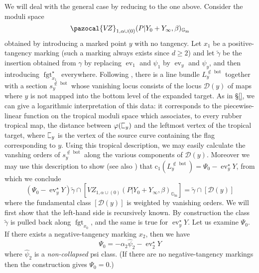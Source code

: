 \documentclass[11pt]{amsart}
\newcommand{\sqC}{\scalebox{0.8}[1.3]{$\sqsubset$}}
\newcommand{\VZ}{\pazocal{V\!Z}}
\newcommand{\st}{\star}
\newcommand{\Gm}{\mathbb{G}_{\text{m}}}
\newcommand{\ev}{\operatorname{ev}}
\newcommand{\fgt}{\operatorname{fgt}}
\newcommand{\Dcal}{\mathcal{D}}
\newcommand{\cchern}{\mathrm{c}}
\theoremstyle{definition}
\theoremstyle{definition}
\begin{document}
We will deal with the general case by reducing to the one above. Consider the moduli space
\begin{equation*} \VZ_{1,\alpha\cup (0)}(P|Y_0+Y_\infty,\beta)_{\Gm}\end{equation*}
obtained by introducing a marked point $y$ with no tangency. Let $x_1$ be a positive-tangency marking (such a marking always exists since $d \geq 2$) and let $\tilde\gamma$ be the insertion obtained from $\gamma$ by replacing $\ev_1$ and $\psi_1$ by $\ev_y$ and $\psi_y$, and then introducing $\fgt_{x_1}^\st$ everywhere. Following \cite{EKatz}, there is a line bundle $L_y^{\not\in \operatorname{bot}}$ together with a section $s_y^{\not\in\operatorname{bot}}$ whose vanishing locus consists of the locus $\Dcal(y)$ of maps where $y$ is not mapped into the bottom level of the expanded target. As in \S \ref{}, we can give a logarithmic interpretation of this data: it corresponds to the piecewise-linear function on the tropical moduli space which associates, to every rubber tropical map, the distance between $\varphi(\sqC_y)$ and the leftmost vertex of the tropical target, where $\sqC_y$ is the vertex of the source curve containing the flag corresponding to $y$. Using this tropical description, we may easily calculate the vanshing orders of $s_y^{\not\in\operatorname{bot}}$ along the various components of $\Dcal(y)$. Moreover we may use this description to show (see also \cite{EKatzLB}) that $\cchern_1(L_y^{\not\in\operatorname{bot}}) = \Psi_0 - \ev_y^\st Y$, from which we conclude
\begin{equation}\label{step 4 recursion} (\Psi_0 - \ev_y^\st Y) \tilde\gamma \cap [VZ_{1,\alpha\cup(0)}(P|Y_0+Y_\infty,\beta)_{\Gm}] = \tilde\gamma \cap [\Dcal(y)]\end{equation}
where the fundamental class $[\Dcal(y)]$ is weighted by vanishing orders. We will first show that the left-hand side is recursively known. By construction the class $\tilde\gamma$ is pulled back along $\fgt_{x_0}$, and the same is true for $\ev_y^\st Y$. Let us examine $\Psi_0$. If there exists a negative-tangency marking $x_2$, then we have \cite{GathmannThesis}
\begin{equation*} \Psi_0 = -\alpha_2 \hat\psi_2 - \ev_2^\st Y \end{equation*}
where $\hat\psi_2$ is a \emph{non-collapsed} psi class. (If there are no negative-tangency markings then the construction \cite[\S 1.5.2]{MaulikPandharipande} gives $\Psi_0=0$.)
\newpage
\end{document}
